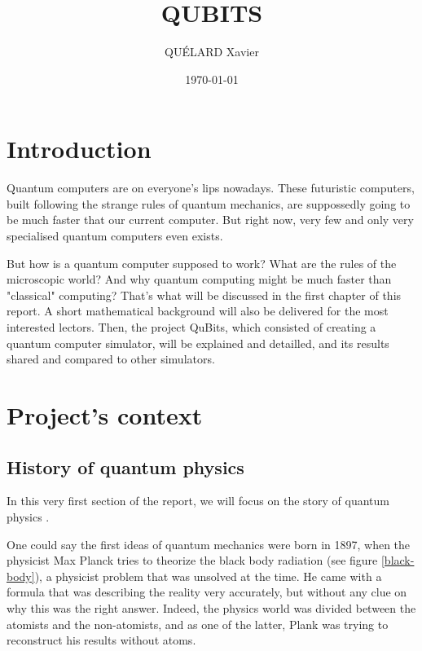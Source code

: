 \documentclass[a4paper,12pt]{report}
\title{QUBITS}
\author{QUÉLARD Xavier}
\date{ \today{} }
\newcommand{\icite}[1]{\up{\textit{\cite{#1}}}}
\newcommand{\para}[1]{\par{#1}\\}
\begin{document}
%
%



%
%

\tableofcontents

%
%

\chapter{Introduction}

\para{
    Quantum computers are on everyone's lips nowadays. These futuristic computers, built following the strange rules of quantum mechanics, are suppossedly going to be much faster that our current computer. But right now, very few and only very specialised quantum computers even exists.
}

\para{
    But how is a quantum computer supposed to work? What are the rules of the microscopic world? And why quantum computing might be much faster than "classical" computing? That's what will be discussed in the first chapter of this report. A short mathematical background will also be delivered for the most interested lectors. Then, the project QuBits, which consisted of creating a quantum computer simulator, will be explained and detailled, and its results shared and compared to other simulators.
}

%
%

\chapter{Project's context}
    \section{History of quantum physics}

\vspace{1\baselineskip}

\para{
    In this very first section of the report, we will focus on the story of quantum physics\icite{bibli1} \icite{bibli2}.
}

\para{
    One could say the first ideas of quantum mechanics were born in 1897, when the physicist Max Planck tries to theorize the black body radiation (see figure \ref{black-body}), a physicist problem that was unsolved at the time. He came with a formula that was describing the reality very accurately, but without any clue on why this was the right answer. Indeed, the physics world was divided between the atomists and the non-atomists, and as one of the latter, Plank was trying to reconstruct his results without atoms.
}
\end{document}
